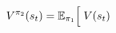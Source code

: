 \documentclass[preview]{standalone}
\begin{document}
\begin{align*}
\special{dvisvgm:raw <g id='unique000'>}V^{\pi_2}(s_t) = \mathbb{E}_{\pi_1}\Big[\; V(s_t)\special{dvisvgm:raw </g>}
\end{align*}
\end{document}

